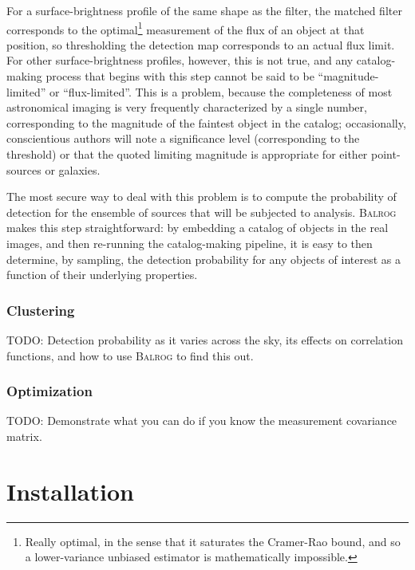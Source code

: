\documentclass[12pt]{book}
\newcommand{\balrog}{\textsc{Balrog}}
\begin{document}
For a surface-brightness profile of the same shape as the filter, the
matched filter corresponds to the optimal\footnote{Really optimal, in
  the sense that it saturates the Cramer-Rao bound, and so a
  lower-variance unbiased estimator is mathematically impossible.}
measurement of the flux of an object at that position, so thresholding
the detection map corresponds to an actual flux limit. For other
surface-brightness profiles, however, this is not true, and any
catalog-making process that begins with this step cannot be said to be
``magnitude-limited'' or ``flux-limited''. This is a problem, because
the completeness of most astronomical imaging is very frequently
characterized by a single number, corresponding to the magnitude of
the faintest object in the catalog; occasionally, conscientious
authors will note a significance level (corresponding to the
threshold) or that the quoted limiting magnitude is appropriate
for either point-sources or galaxies. 

The most secure way to deal with this problem is to compute the
probability of detection for the ensemble of sources that will be
subjected to analysis. \balrog{} makes this step straightforward: by
embedding a catalog of objects in the real images, and then re-running
the catalog-making pipeline, it is easy to then determine, by
sampling, the detection probability for any objects of interest as a
function of their underlying properties.



\subsection{Clustering}
TODO: Detection probability as it varies across the sky, its effects
on correlation functions, and how to use \balrog{} to find this out.

\subsection{Optimization}
TODO: Demonstrate what you can do if you know the measurement
covariance matrix.




\chapter{Installation}
\label{sec:install}
\end{document}
